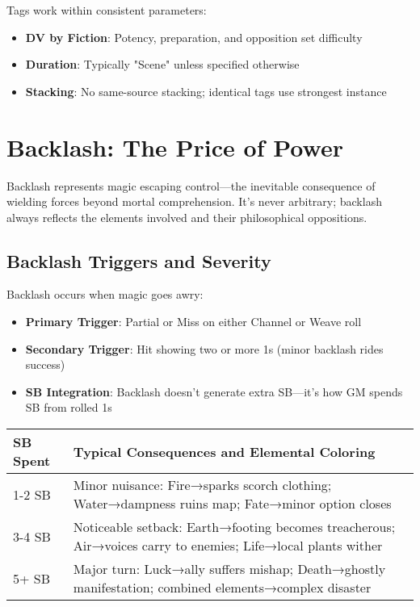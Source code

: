 Tags work within consistent parameters:
\begin{itemize}
    \item \textbf{DV by Fiction}: Potency, preparation, and opposition set difficulty
    \item \textbf{Duration}: Typically "Scene" unless specified otherwise
    \item \textbf{Stacking}: No same-source stacking; identical tags use strongest instance
\end{itemize}

\section*{Backlash: The Price of Power}

Backlash represents magic escaping control—the inevitable consequence of wielding forces beyond mortal comprehension. It's never arbitrary; backlash always reflects the elements involved and their philosophical oppositions.

\subsection*{Backlash Triggers and Severity}

Backlash occurs when magic goes awry:
\begin{itemize}
    \item \textbf{Primary Trigger}: Partial or Miss on either Channel or Weave roll
    \item \textbf{Secondary Trigger}: Hit showing two or more 1s (minor backlash rides success)
    \item \textbf{SB Integration}: Backlash doesn't generate extra SB—it's how GM spends SB from rolled 1s
\end{itemize}

\begin{fatebox}
\begin{tabularx}{\textwidth}{lX}
\toprule
\textbf{SB Spent} & \textbf{Typical Consequences and Elemental Coloring} \\
\midrule
1-2 SB & Minor nuisance: Fire→sparks scorch clothing; Water→dampness ruins map; Fate→minor option closes \\
3-4 SB & Noticeable setback: Earth→footing becomes treacherous; Air→voices carry to enemies; Life→local plants wither \\
5+ SB & Major turn: Luck→ally suffers mishap; Death→ghostly manifestation; combined elements→complex disaster \\
\bottomrule
\end{tabularx}
\end{fatebox}

